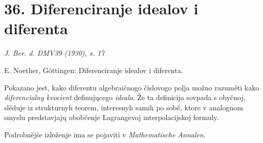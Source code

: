 \documentclass[11pt]{article}
\begin{document}
\section*{36. Diferenciranje idealov i diferenta}

\begin{center}
\emph{J. Ber. d. DMV39 (1930), s. 17}
\end{center}

E. Noether, Göttingen: Diferenciranje idealov i diferenta.

Pokazano jest, kako diferentu algebraičnogo čislovogo polja možno razuměti kako \emph{diferencialny kvocient} definujųcego \emph{ideala}. Že ta definicija sovpada s obyčnoj, slěduje iz strukturnyh teorem, interesnyh samih po sobě, ktore v analognom smyslu predstavjajų obobčenje Lagrangevoj interpolacijskoj formuly.

Podrobnějše izloženje ima se pojaviti v \emph{Mathematische Annalen}.
\end{document}
